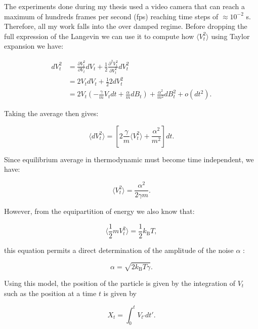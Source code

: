 The experiments done during my thesis used a video camera that can reach a maximum of hundreds frames per second (\gls{fps}) reaching time steps of $\approx 10^{-2}$ s. Therefore, all my work falls into the over damped regime. Before dropping the full expression of the Langevin we can use it to compute how $\langle V_t ^2 \rangle$ using Taylor expansion we have:

\begin{equation}
	\begin{aligned}
	dV_t^2 &= \frac{\partial V_t ^ 2}{\partial V_t} d V_t + \frac{1}{2} \frac{\partial ^2 V_t^2}{\partial V_t ^2} dV_t^2  \\
	& = 2 V_t dV_t + \frac{1}{2} 2dV_t^2 \\
	& = 2V_t\left( -\frac{\gamma}{m}V_tdt + \frac{\alpha}{m}dB_t  \right) + \frac{\alpha^2}{m^2}dB_t ^2 + o(dt^2).
	\end{aligned}
\end{equation}

Taking the average then gives:

\begin{equation}
	\langle dV_t^2 \rangle = \left[2 \frac{\gamma}{m} \langle V_t ^2 \rangle + \frac{\alpha^2}{m^2}\right]dt.
\end{equation}

Since equilibrium average in thermodynamic must become time independent, we have:

\begin{equation}
	\langle V_t ^2\rangle = \frac{\alpha ^2}{2 \gamma m}.
\end{equation}

However, from the equipartition of energy we also know that:

\begin{equation}
	\langle \frac{1}{2} m V_t ^2 \rangle  = \frac{1}{2} k_\mathrm{B} T,
\end{equation}

this equation permits a direct determination of the amplitude of the noise $\alpha$ : 

\begin{equation}
	\alpha = \sqrt{2k_\mathrm{B}T \gamma}.
\end{equation}

Using this model, the position of the particle is given by the integration of $V_t$ such as the position at a time $t$ is given by

\begin{equation}
	X_t = \int _0 ^t V_{t'}dt'.
	\label{Eq:particle_position}
\end{equation}

